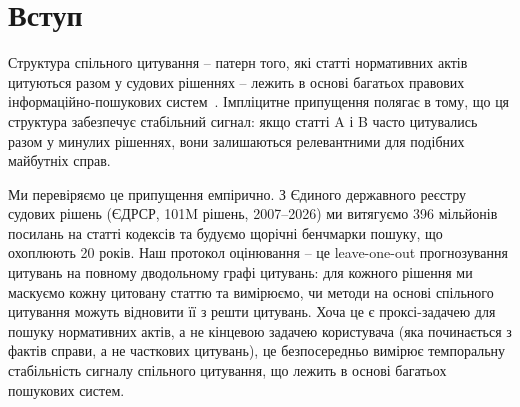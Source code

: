 \begin{abstract}
Структура спільного цитування загалом вважається стабільним пошуковим сигналом у правових інформаційних системах.
Ми перевіряємо це припущення лонгітудинально, побудувавши UA-StatuteRetrieval – бенчмарк, що вимірює прогнозованість спільного цитування на 20 щорічних зрізах (2007–2026) із 396 мільйонів посилань на статті кодексів у 101 мільйоні рішень українських судів.
Використовуючи протокол leave-one-out на повному дводольному графі цитувань, ми виявляємо, що MRR за Adamic-Adar знижується на 33\% на \emph{фіксованому} наборі статей (з 0.43 до 0.29) і на 47\% за темпорального розділення train/test (з 0.51 до 0.27) – що підтверджує справжнє темпоральне згасання, а не композиційний зсув чи артефакт оцінювання.
Згасання є нерівномірним: кримінальне процесуальне право зберігає стабільні патерни спільного цитування (MRR $\sim$0.40), тоді як цивільне право деградує з 0.35 до 0.15, що збігається із судовою реформою 2017 року.
Статті-хаби ($>$100K цитувань) протистоять згасанню, але статті середньої частоти (1K–10K) – практичний фронтир пошуку – втрачають половину прогнозованості.
Текстовий базелайн BM25 згасає ще швидше (31\%), а аналіз дрейфу ембедингів за допомогою E5-large виявляє семантичний зсув у 4.3\% у контексті цитування статей, що надає механістичне пояснення спостережуваного згасання.
Бенчмарк опубліковано за адресою \url{https://huggingface.co/datasets/overthelex/ua-statute-retrieval}.
\end{abstract}

\section{Вступ}
\label{sec:intro}

Структура спільного цитування – патерн того, які статті нормативних актів цитуються разом у судових рішеннях – лежить в основі багатьох правових інформаційно-пошукових систем~\citep{tang2024casegnn,ho2025incorporating,barron2025bridging}.
Імпліцитне припущення полягає в тому, що ця структура забезпечує стабільний сигнал: якщо статті A і B часто цитувались разом у минулих рішеннях, вони залишаються релевантними для подібних майбутніх справ.

Ми перевіряємо це припущення емпірично.
З Єдиного державного реєстру судових рішень (ЄДРСР, 101M рішень, 2007–2026) ми витягуємо 396 мільйонів посилань на статті кодексів та будуємо щорічні бенчмарки пошуку, що охоплюють 20 років.
Наш протокол оцінювання – це leave-one-out прогнозування цитувань на повному дводольному графі цитувань: для кожного рішення ми маскуємо кожну цитовану статтю та вимірюємо, чи методи на основі спільного цитування можуть відновити її з решти цитувань.
Хоча це є проксі-задачею для пошуку нормативних актів, а не кінцевою задачею користувача (яка починається з фактів справи, а не часткових цитувань), це безпосередньо вимірює темпоральну стабільність сигналу спільного цитування, що лежить в основі багатьох пошукових систем.

